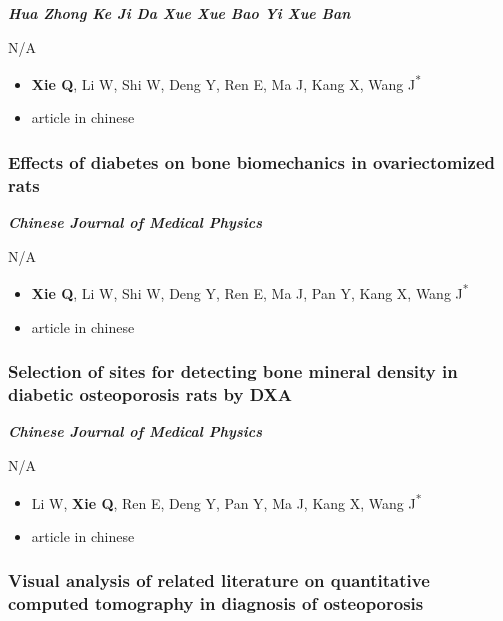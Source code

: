 \documentclass[
]{article}
\providecommand{\tightlist}{%
  \setlength{\itemsep}{0pt}\setlength{\parskip}{0pt}}
\begin{document}
\textbf{\emph{Hua Zhong Ke Ji Da Xue Xue Bao Yi Xue Ban}}

N/A

\begin{itemize}
\tightlist
\item
  \textbf{Xie Q}, Li W, Shi W, Deng Y, Ren E, Ma J, Kang X, Wang
  J\textsuperscript{*}
\item
  article in chinese
\end{itemize}

\hypertarget{effects-of-diabetes-on-bone-biomechanics-in-ovariectomized-rats}{%
\subsubsection{Effects of diabetes on bone biomechanics in
ovariectomized
rats}\label{effects-of-diabetes-on-bone-biomechanics-in-ovariectomized-rats}}

\textbf{\emph{Chinese Journal of Medical Physics}}

N/A

\begin{itemize}
\tightlist
\item
  \textbf{Xie Q}, Li W, Shi W, Deng Y, Ren E, Ma J, Pan Y, Kang X, Wang
  J\textsuperscript{*}
\item
  article in chinese
\end{itemize}

\hypertarget{selection-of-sites-for-detecting-bone-mineral-density-in-diabetic-osteoporosis-rats-by-dxa}{%
\subsubsection{Selection of sites for detecting bone mineral density in
diabetic osteoporosis rats by
DXA}\label{selection-of-sites-for-detecting-bone-mineral-density-in-diabetic-osteoporosis-rats-by-dxa}}

\textbf{\emph{Chinese Journal of Medical Physics}}

N/A

\begin{itemize}
\tightlist
\item
  Li W, \textbf{Xie Q}, Ren E, Deng Y, Pan Y, Ma J, Kang X, Wang
  J\textsuperscript{*}
\item
  article in chinese
\end{itemize}

\hypertarget{visual-analysis-of-related-literature-on-quantitative-computed-tomography-in-diagnosis-of-osteoporosis}{%
\subsubsection{Visual analysis of related literature on quantitative
computed tomography in diagnosis of
osteoporosis}\label{visual-analysis-of-related-literature-on-quantitative-computed-tomography-in-diagnosis-of-osteoporosis}}
\end{document}
